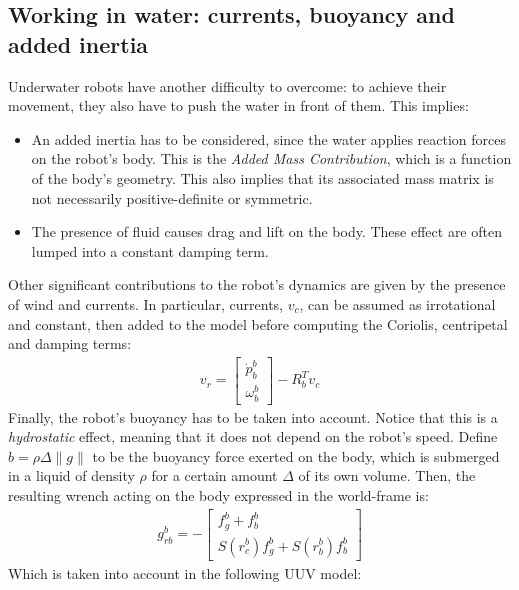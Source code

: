 \subsection{Working in water: currents, buoyancy and added inertia}
Underwater robots have another difficulty to overcome: to achieve their movement, they also have to push the water in front of them. This implies:
\begin{itemize}
    \item An added inertia has to be considered, since the water applies reaction forces on the robot's body. This is the \textit{Added Mass Contribution}, which is a function of the body's geometry. This also implies that its associated mass matrix is not necessarily positive-definite or symmetric. 
    \item The presence of fluid causes drag and lift on the body. These effect are often lumped into a constant damping term.
\end{itemize}
Other significant contributions to the robot's dynamics are given by the presence of wind and currents. In particular, currents, $v_c$, can be assumed as irrotational and constant, then added to the model before computing the Coriolis, centripetal and damping terms:
\begin{gather*}
    v_r=\begin{bmatrix}
        \dot{p}_b^b\\ \omega_b^b
    \end{bmatrix}-R_b^Tv_c
\end{gather*}
Finally, the robot's buoyancy has to be taken into account. Notice that this is a \textit{hydrostatic} effect, meaning that it does not depend on the robot's speed. Define $b=\rho\Delta\|g\|$ to be the buoyancy force exerted on the body, which is submerged in a liquid of density $\rho$ for a certain amount $\Delta$ of its own volume. Then, the resulting wrench acting on the body expressed in the world-frame is:
\begin{gather*}
    g_{rb}^b=-
    \begin{bmatrix}
        f_g^b+f_b^b\\
        S(r_c^b)f_g^b+S(r_b^b)f_b^b
    \end{bmatrix}
\end{gather*}
Which is taken into account in the following UUV model:
